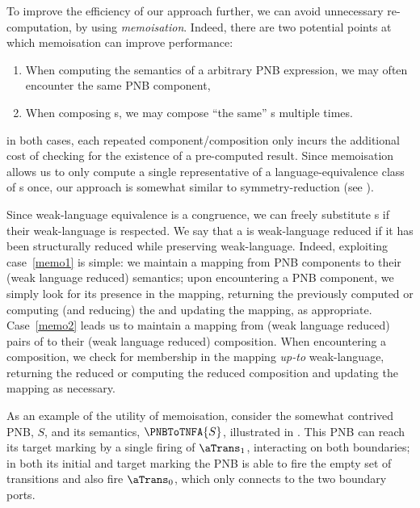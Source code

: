 To improve the efficiency of our approach further, we can avoid unnecessary
re-computation, by using \emph{memoisation}. Indeed, there are two potential
points at which memoisation can improve performance:
\begin{enumerate}
    \item\label{memo1} When computing the \TNFA{} semantics of a arbitrary PNB
        expression, we may often encounter the same PNB component,
    \item\label{memo2} When composing \TNFA{}s, we may compose ``the same''
        \TNFA{}s multiple times.
\end{enumerate}
in both cases, each repeated component/composition only incurs the additional
cost of checking for the existence of a pre-computed result. Since memoisation
allows us to only compute a single representative of a language-equivalence
class of \TNFA{}s once, our approach is somewhat
similar to symmetry-reduction (see ).

Since weak-language equivalence is a congruence, we can freely substitute
\TNFA{}s if their weak-language is respected. We say that a \TNFA{} is
weak-language reduced if it has been structurally reduced while preserving
weak-language.  Indeed, exploiting case~\ref{memo1} is simple: we maintain a
mapping from PNB components to their (weak language reduced) \TNFA{} semantics;
upon encountering a PNB component, we simply look for its presence in the
mapping, returning the previously computed \TNFA{} or computing (and reducing)
the \TNFA{} and updating the mapping, as appropriate. Case~\ref{memo2} leads us
to maintain a mapping from (weak language reduced) pairs of \TNFA{} to their
(weak language reduced) composition. When encountering a composition, we check
for membership in the mapping \emph{up-to} weak-language, returning the reduced
\TNFA{} or computing the reduced composition and updating the mapping as
necessary.

\newcommand{\stewie}{S}

As an example of the utility of memoisation, consider the somewhat contrived
PNB, $\stewie$, and its \TNFA{} semantics, $\PNBToTNFA{\stewie}$, illustrated
in . This PNB can reach its target marking by a
single firing of $\aTrans_1$, interacting on both boundaries; in both its
initial and target marking the PNB is able to fire the empty set of transitions
and also fire $\aTrans_0$, which only connects to the two boundary ports.


